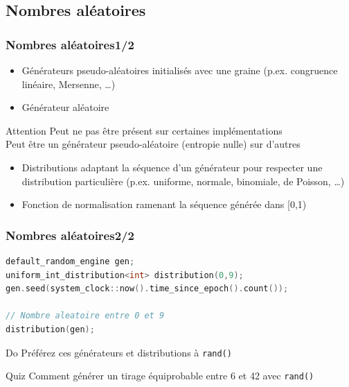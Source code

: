 \documentclass[C++.tex]{subfiles}
\begin{document}
\subsection*{Nombres aléatoires}
\begin{frame}[fragile]
	\frametitle{Nombres aléatoires\titlehfill{}1/2}
	\begin{itemize}
		\item Générateurs pseudo-aléatoires initialisés avec une graine (p.ex. congruence linéaire, Mersenne, \ldots)
		\item Générateur aléatoire
	\end{itemize}

	\begin{alertblock}{Attention}
		Peut ne pas être présent sur certaines implémentations\\
		Peut être un générateur pseudo-aléatoire (entropie nulle) sur d'autres
	\end{alertblock}

	\begin{itemize}
		\item Distributions adaptant la séquence d'un générateur pour respecter une distribution particulière (p.ex. uniforme, normale, binomiale, de Poisson, \ldots)
		\item Fonction de normalisation ramenant la séquence générée dans [0,1)
	\end{itemize}
\end{frame}

\begin{frame}[fragile]
	\frametitle{Nombres aléatoires\titlehfill{}2/2}
	\begin{lstlisting}[language=C++]
default_random_engine gen;
uniform_int_distribution<int> distribution(0,9);
gen.seed(system_clock::now().time_since_epoch().count());

// Nombre aleatoire entre 0 et 9
distribution(gen);\end{lstlisting}

	\begin{exampleblock}{Do}
		Préférez ces générateurs et distributions à \lstinline|rand()|
	\end{exampleblock}

	\begin{block}{Quiz}
		Comment générer un tirage équiprobable entre 6 et 42 avec \lstinline|rand()|
	\end{block}
\end{frame}
\end{document}
